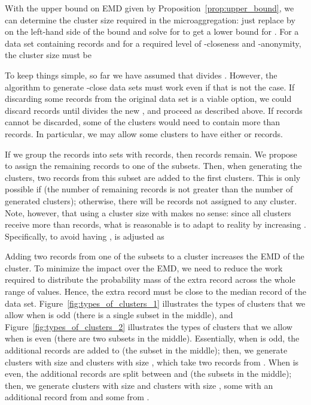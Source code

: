 \documentclass[10pt,journal,compsoc]{IEEEtran}
\theoremstyle{definition}
\theoremstyle{plain}
\begin{document}
With the upper bound on EMD given by Proposition~\ref{prop:upper_bound},
we can determine the cluster size required in the microaggregation:
just replace  by  on the left-hand side of the bound
and solve for  to get a lower bound for .
For a data set containing  records and for a required level of
-closeness and -anonymity, the cluster size must be


To keep things simple, so far we have assumed that  divides
. However, the algorithm to generate -close data sets must
work even if that is not the case. If discarding some records from
the original data set is a viable option, we could discard records
until  divides the new , and proceed as described above. If
records cannot be discarded, some of the clusters would need to contain
more than  records. In particular, we may allow some clusters to have
either  or  records.

If we group the records into  sets with  records, then
 records remain. We propose to assign the remaining
 records to one of the subsets. Then, when generating the clusters, two
records from this subset are added to the first  clusters. This
is only possible if 
 (the number of remaining records is
not greater than the number of generated clusters); otherwise, there will be
records not assigned to any cluster. Note, however, that
using a cluster size  with  
makes no sense: 
since all clusters receive more than  records, what is reasonable
is to adapt to reality by increasing .
Specifically, to avoid having ,  is adjusted as


Adding two records from one of the subsets to a cluster increases
the EMD of the cluster. To minimize the impact
over the EMD, we need to reduce the work required to distribute the
probability mass of the extra record across the whole range of values.
Hence, the extra record must be close to the median record of the
data set. Figure~\ref{fig:types_of_clusters_1} illustrates the types
of clusters that we allow when  is odd (there is a single subset
in the middle), and Figure~\ref{fig:types_of_clusters_2} illustrates
the types of clusters that we allow when  is even (there are two
subsets in the middle). Essentially, when  is odd, the additional
records are added to  (the subset in the middle); then, we
generate clusters with size  and clusters with size , which
take two records from . When  is even, the additional
records are split between  and  (the
subsets in the middle); then, we generate clusters with size  and clusters
with size , some with an additional record from 
and some from .
\end{document}
